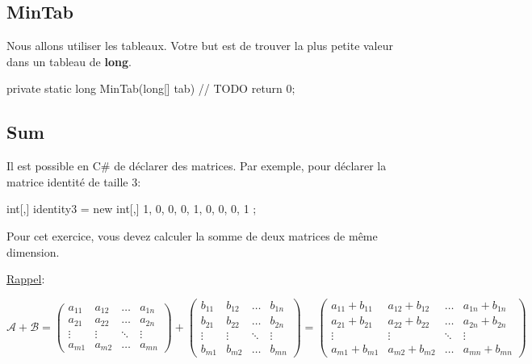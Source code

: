 \subsection{MinTab}

Nous allons utiliser les tableaux. Votre but est de trouver la plus petite valeur
dans un tableau de \textbf{long}.

\begin{code}
private static long MinTab(long[] tab)
{
	// TODO
    return 0;
}
\end{code}

\subsection{Sum}

Il est possible en C\# de déclarer des matrices. 
Par exemple, pour déclarer la matrice identité de taille 3:

\begin{code}
int[,] identity3 = new int[,]
{
    {1, 0, 0},
    {0, 1, 0},
    {0, 0, 1}
};
\end{code}

Pour cet exercice, vous devez calculer la somme de deux matrices de même dimension.

\underline{Rappel}:

$$
\mathcal{A} + \mathcal{B} = \begin{pmatrix}
   a_{11} & a_{12}  & \dots & a_{1n}\\
   a_{21} & a_{22}  & \dots & a_{2n}\\
   \vdots & \vdots & \ddots & \vdots \\
   a_{m1} & a_{m2} & \dots &  a_{mn}
 \end{pmatrix} + \begin{pmatrix}
   b_{11} & b_{12}  & \dots & b_{1n}\\
   b_{21} & b_{22}  & \dots & b_{2n}\\
   \vdots & \vdots & \ddots & \vdots \\
   b_{m1} & b_{m2} & \dots &  b_{mn}
 \end{pmatrix} = \begin{pmatrix}
   a_{11} + b_{11} & a_{12} + b_{12}  & \dots & a_{1n} + b_{1n}\\
   a_{21} + b_{21} & a_{22} + b_{22}  & \dots & a_{2n} + b_{2n}\\
   \vdots & \vdots & \ddots & \vdots \\
   a_{m1} + b_{m1} & a_{m2} + b_{m2} & \dots &  a_{mn} + b_{mn}
 \end{pmatrix}
$$

